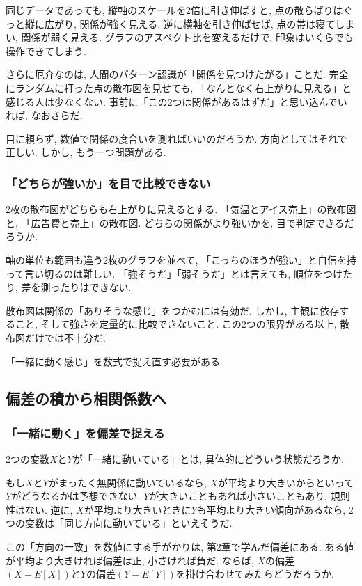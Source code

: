 同じデータであっても, 縦軸のスケールを2倍に引き伸ばすと, 点の散らばりはぐっと縦に広がり, 関係が強く見える.
逆に横軸を引き伸ばせば, 点の帯は寝てしまい, 関係が弱く見える.
グラフのアスペクト比を変えるだけで, 印象はいくらでも操作できてしまう.

さらに厄介なのは, 人間のパターン認識が「関係を見つけたがる」ことだ.
完全にランダムに打った点の散布図を見せても, 「なんとなく右上がりに見える」と感じる人は少なくない.
事前に「この2つは関係があるはずだ」と思い込んでいれば, なおさらだ.

目に頼らず, 数値で関係の度合いを測ればいいのだろうか.
方向としてはそれで正しい. しかし, もう一つ問題がある.

\subsubsection*{「どちらが強いか」を目で比較できない}

2枚の散布図がどちらも右上がりに見えるとする.
「気温とアイス売上」の散布図と, 「広告費と売上」の散布図.
どちらの関係がより強いかを, 目で判定できるだろうか.

軸の単位も範囲も違う2枚のグラフを並べて, 「こっちのほうが強い」と自信を持って言い切るのは難しい.
「強そうだ」「弱そうだ」とは言えても, 順位をつけたり, 差を測ったりはできない.

散布図は関係の「ありそうな感じ」をつかむには有効だ.
しかし, 主観に依存すること, そして強さを定量的に比較できないこと.
この2つの限界がある以上, 散布図だけでは不十分だ.

「一緒に動く感じ」を数式で捉え直す必要がある.


\subsection{偏差の積から相関係数へ}

\subsubsection*{「一緒に動く」を偏差で捉える}

2つの変数$X$と$Y$が「一緒に動いている」とは, 具体的にどういう状態だろうか.

もし$X$と$Y$がまったく無関係に動いているなら, $X$が平均より大きいからといって$Y$がどうなるかは予想できない.
$Y$が大きいこともあれば小さいこともあり, 規則性はない.
逆に, $X$が平均より大きいときに$Y$も平均より大きい傾向があるなら, 2つの変数は「同じ方向に動いている」といえそうだ.

この「方向の一致」を数値にする手がかりは, 第2章で学んだ偏差にある.
ある値が平均より大きければ偏差は正, 小さければ負だ.
ならば, $X$の偏差$(X - E[X])$と$Y$の偏差$(Y - E[Y])$を掛け合わせてみたらどうだろうか.

